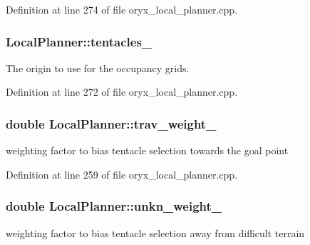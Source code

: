 \-Definition at line 274 of file oryx\-\_\-local\-\_\-planner.\-cpp.

\subsubsection[{tentacles\-\_\-}]{ {\bf \-Local\-Planner\-::tentacles\-\_\-}\hspace{0.3cm}{\ttfamily  [private]}}\label{classLocalPlanner_ae8cae1e72eacad73b0ec423f0352c887}


\-The origin to use for the occupancy grids. 



\-Definition at line 272 of file oryx\-\_\-local\-\_\-planner.\-cpp.

\subsubsection[{trav\-\_\-weight\-\_\-}]{\setlength{\rightskip}{0pt plus 5cm}double {\bf \-Local\-Planner\-::trav\-\_\-weight\-\_\-}\hspace{0.3cm}{\ttfamily  [private]}}\label{classLocalPlanner_a6f668b354b481784a886b7f935f9bef4}


weighting factor to bias tentacle selection towards the goal point 



\-Definition at line 259 of file oryx\-\_\-local\-\_\-planner.\-cpp.

\subsubsection[{unkn\-\_\-weight\-\_\-}]{\setlength{\rightskip}{0pt plus 5cm}double {\bf \-Local\-Planner\-::unkn\-\_\-weight\-\_\-}\hspace{0.3cm}{\ttfamily  [private]}}\label{classLocalPlanner_a633f5fdf6a570395d59e02f1f714fba2}


weighting factor to bias tentacle selection away from difficult terrain 



